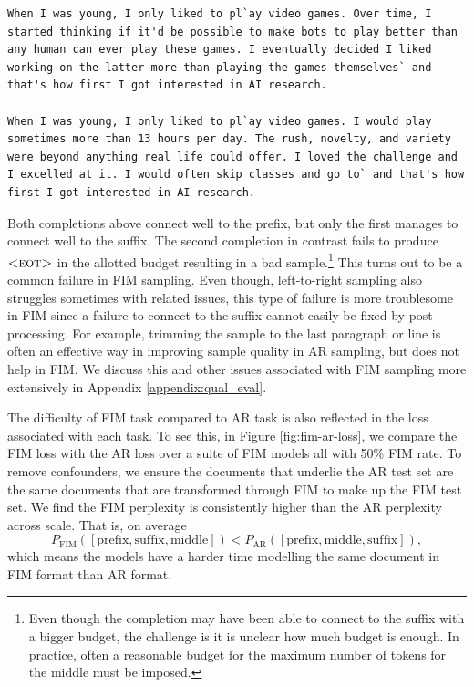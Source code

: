 \documentclass[postscript]{article}
\begin{document}
\vspace{-6pt}
\begin{center}
\begin{minipage}{5in}
\begin{lstlisting}[style=text]
When I was young, I only liked to pl`ay video games. Over time, I started thinking if it'd be possible to make bots to play better than any human can ever play these games. I eventually decided I liked working on the latter more than playing the games themselves` and that's how first I got interested in AI research.

When I was young, I only liked to pl`ay video games. I would play sometimes more than 13 hours per day. The rush, novelty, and variety were beyond anything real life could offer. I loved the challenge and I excelled at it. I would often skip classes and go to` and that's how first I got interested in AI research.
\end{lstlisting}
\end{minipage}
\end{center}

Both completions above connect well to the prefix, but only the first manages to connect well to the suffix. The second completion in contrast fails to produce $\textsc{<eot>}$ in the allotted budget resulting in a bad sample.\footnote{Even though the completion may have been able to connect to the suffix with a bigger budget, the challenge is it is unclear how much budget is enough. In practice, often a reasonable budget for the maximum number of tokens for the middle must be imposed.} This turns out to be a common failure in FIM sampling. Even though, left-to-right sampling also struggles sometimes with related issues, this type of failure is more troublesome in FIM since a failure to connect to the suffix cannot easily be fixed by post-processing. For example, trimming the sample to the last paragraph or line is often an effective way in improving sample quality in AR sampling, but does not help in FIM. We discuss this and other issues associated with FIM sampling more extensively in Appendix \ref{appendix:qual_eval}. 

The difficulty of FIM task compared to AR task is also reflected in the loss associated with each task. To see this, in Figure \ref{fig:fim-ar-loss}, we compare the FIM loss with the AR loss over a suite of FIM models all with 50\% FIM rate. To remove confounders, we ensure the documents that underlie the AR test set are the same documents that are transformed through FIM to make up the FIM test set. We find the FIM perplexity is consistently higher than the AR perplexity across scale.  That is, on average
\[ P_{\text{FIM}}( [\text{prefix}, \text{suffix}, \text{middle}]) < P_{\text{AR}}([\text{prefix}, \text{middle}, \text{suffix}]), \]
which means the models have a harder time modelling the same document in FIM format than AR format. 
\end{document}
